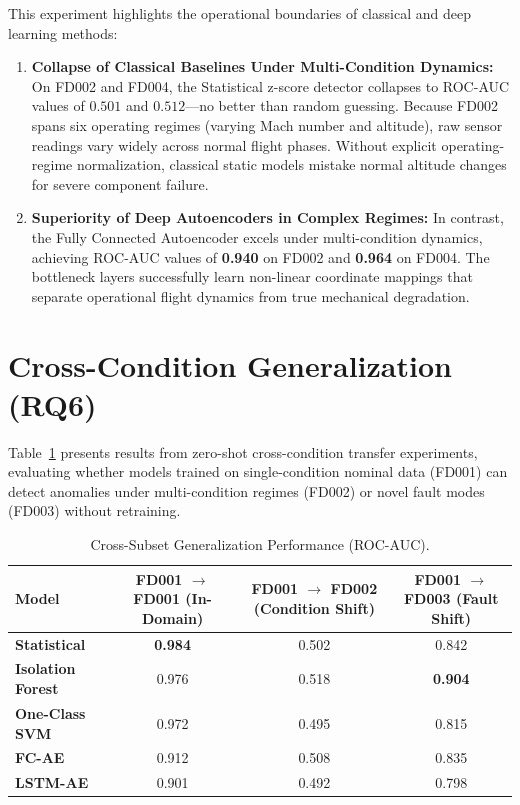 \documentclass[12pt,a4paper,oneside]{report}
\begin{document}
This experiment highlights the operational boundaries of classical and deep learning methods:
\begin{enumerate}
    \item \textbf{Collapse of Classical Baselines Under Multi-Condition Dynamics:} On FD002 and FD004, the Statistical z-score detector collapses to ROC-AUC values of $0.501$ and $0.512$—no better than random guessing. Because FD002 spans six operating regimes (varying Mach number and altitude), raw sensor readings vary widely across normal flight phases. Without explicit operating-regime normalization, classical static models mistake normal altitude changes for severe component failure.
    \item \textbf{Superiority of Deep Autoencoders in Complex Regimes:} In contrast, the Fully Connected Autoencoder excels under multi-condition dynamics, achieving ROC-AUC values of \textbf{0.940} on FD002 and \textbf{0.964} on FD004. The bottleneck layers successfully learn non-linear coordinate mappings that separate operational flight dynamics from true mechanical degradation.
\end{enumerate}

\section{Cross-Condition Generalization (RQ6)}
Table~\ref{tab:cross_condition_transfer} presents results from zero-shot cross-condition transfer experiments, evaluating whether models trained on single-condition nominal data (FD001) can detect anomalies under multi-condition regimes (FD002) or novel fault modes (FD003) without retraining.

\begin{table}[htbp]
    \centering
    \caption{Cross-Subset Generalization Performance (ROC-AUC).}
    \label{tab:cross_condition_transfer}
    \begin{tabular}{lccc}
        \toprule
        \textbf{Model} & \textbf{FD001 $\rightarrow$ FD001 (In-Domain)} & \textbf{FD001 $\rightarrow$ FD002 (Condition Shift)} & \textbf{FD001 $\rightarrow$ FD003 (Fault Shift)} \\
        \midrule
        \textbf{Statistical} & \textbf{0.984} & 0.502 & 0.842 \\
        \textbf{Isolation Forest} & 0.976 & 0.518 & \textbf{0.904} \\
        \textbf{One-Class SVM} & 0.972 & 0.495 & 0.815 \\
        \textbf{FC-AE} & 0.912 & 0.508 & 0.835 \\
        \textbf{LSTM-AE} & 0.901 & 0.492 & 0.798 \\
        \bottomrule
    \end{tabular}
\end{table}
\end{document}
